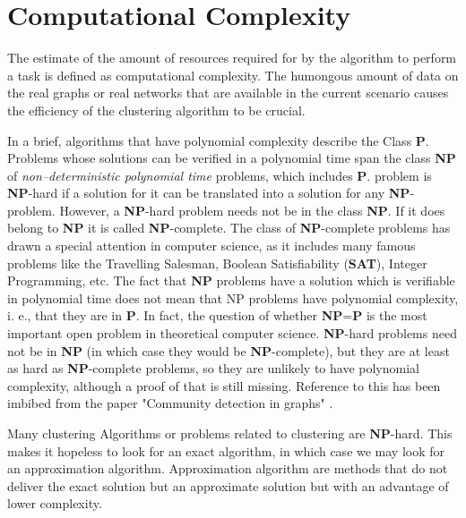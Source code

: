 \section{Computational Complexity}
 The estimate of the amount of resources required for by the algorithm to perform a task is defined as computational complexity. The humongous amount of data on the real graphs or real networks that are available in the current scenario causes the efficiency of the clustering algorithm to be crucial.
\par In a brief, algorithms that have polynomial complexity describe the Class \textbf{P}. Problems whose solutions can be verified in a polynomial time span the class \textbf{NP} of \textit{non--deterministic polynomial time} problems, which includes \textbf{P}. problem is \textbf{NP}-hard if a solution for it can be
translated into a solution for any \textbf{NP}-problem. However,
a \textbf{NP}-hard problem needs not be in the class \textbf{NP}. If it
does belong to \textbf{NP} it is called \textbf{NP}-complete. The class
of \textbf{NP}-complete problems has drawn a special attention
in computer science, as it includes many famous problems like the Travelling Salesman, Boolean Satisfiability
(\textbf{SAT}), Integer Programming, etc.
The fact that \textbf{NP} problems have a solution which is verifiable in polynomial
time does not mean that NP problems have polynomial
complexity, i. e., that they are in \textbf{P}. In fact, the question of whether \textbf{NP}=\textbf{P} is the most important open problem in theoretical computer science. \textbf{NP}-hard problems
need not be in \textbf{NP} (in which case they would be \textbf{NP}-complete), but they are at least as hard as \textbf{NP}-complete
problems, so they are unlikely to have polynomial complexity, although a proof of that is still missing. Reference to this has been imbibed from the paper "Community detection in graphs" \cite{communitypaper}.
\par Many clustering Algorithms or problems related to clustering are \textbf{NP}-hard. This makes it hopeless to look for an exact algorithm, in which case we may look for an approximation algorithm. Approximation algorithm are methods that do not deliver the exact solution but an approximate solution but with an advantage of lower complexity. \cite{communitypaper}

